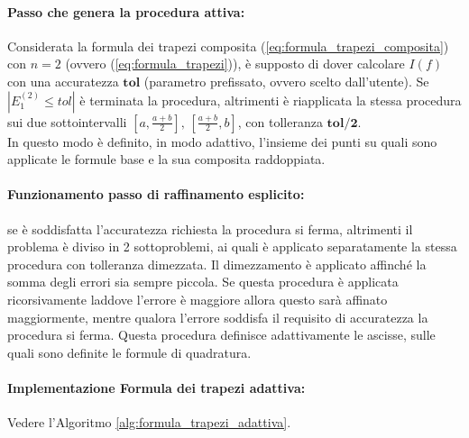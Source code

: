 \paragraph{Passo che genera la procedura attiva:} Considerata la formula dei trapezi composita (\ref{eq:formula_trapezi_composita}) con $n=2$ (ovvero (\ref{eq:formula_trapezi})), è supposto di dover calcolare $I(f)$ con una accuratezza $\boldsymbol{tol}$ (parametro prefissato, ovvero scelto dall'utente). Se $|E_1^{(2)}\leq tol|$ è terminata la procedura, altrimenti è riapplicata la stessa procedura sui due sottointervalli $\left[a,\frac{a+b}{2}\right],\, \left[\frac{a+b}{2},b\right]$, con tolleranza $\boldsymbol{tol/2}$.\\
In questo modo è definito, in modo adattivo, l'insieme dei punti su quali sono applicate le formule base e la sua composita raddoppiata.

\paragraph{Funzionamento passo di raffinamento esplicito:} se è soddisfatta l'accuratezza richiesta la procedura si ferma, altrimenti il problema è diviso in 2 sottoproblemi, ai quali è applicato separatamente la stessa procedura con tolleranza dimezzata. Il dimezzamento è applicato affinché la somma degli errori sia sempre piccola. Se questa procedura è applicata ricorsivamente laddove l'errore è maggiore allora questo sarà affinato maggiormente, mentre qualora l'errore soddisfa il requisito di accuratezza la procedura si ferma. Questa procedura definisce adattivamente le ascisse, sulle quali sono definite le formule di quadratura.

\paragraph{Implementazione Formula dei trapezi adattiva:} Vedere l'Algoritmo \ref{alg:formula_trapezi_adattiva}.

